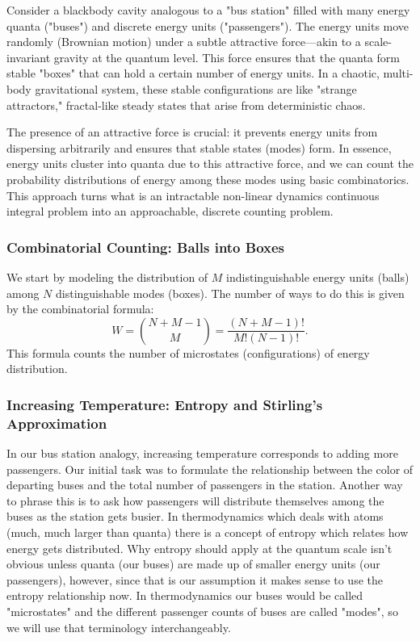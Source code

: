 \documentclass{article}
\begin{document}
Consider a blackbody cavity analogous to a "bus station" filled with many energy quanta ("buses") and discrete energy units ("passengers"). The energy units move randomly (Brownian motion) under a subtle attractive force—akin to a scale-invariant gravity at the quantum level. This force ensures that the quanta form stable "boxes" that can hold a certain number of energy units. In a chaotic, multi-body gravitational system, these stable configurations are like "strange attractors," fractal-like steady states that arise from deterministic chaos.

The presence of an attractive force is crucial: it prevents energy units from dispersing arbitrarily and ensures that stable states (modes) form. In essence, energy units cluster into quanta due to this attractive force, and we can count the probability distributions of energy among these modes using basic combinatorics. This approach turns what is an intractable non-linear dynamics continuous integral problem into an approachable, discrete counting problem.

\subsubsection*{Combinatorial Counting: Balls into Boxes}

We start by modeling the distribution of $M$ indistinguishable energy units (balls) among $N$ distinguishable modes (boxes). The number of ways to do this is given by the combinatorial formula:
\[
W = \binom{N+M-1}{M} = \frac{(N+M-1)!}{M!(N-1)!}.
\]
This formula counts the number of microstates (configurations) of energy distribution.

\subsubsection*{Increasing Temperature: Entropy and Stirling’s Approximation}
In our bus station analogy, increasing temperature corresponds to adding more passengers. Our initial task was to formulate the relationship between the color of departing buses and the total number of passengers in the station. Another way to phrase this is to ask how passengers will distribute themselves among the buses as the station gets busier. In thermodynamics which deals with atoms (much, much larger than quanta) there is a concept of entropy which relates how energy gets distributed. Why entropy should apply at the quantum scale isn't obvious unless quanta (our buses) are made up of smaller energy units (our passengers), however, since that is our assumption it makes sense to use the entropy relationship now. In thermodynamics our buses would be called "microstates" and the different passenger counts of buses are called "modes", so we will use that terminology interchangeably.
\newline
\end{document}
